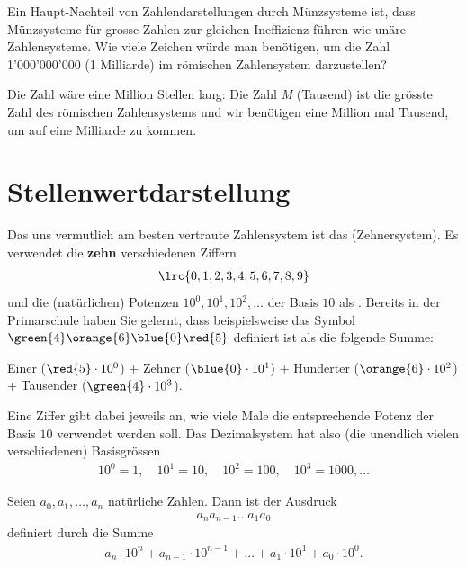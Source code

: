 \begin{myexercise}\label{myexercise:grosse-roem-zahlen}
	Ein Haupt-Nachteil von Zahlendarstellungen durch Münzsysteme ist, dass Münzsysteme für grosse Zahlen zur gleichen Ineffizienz führen wie unäre Zahlensysteme. Wie viele Zeichen würde man benötigen, um die Zahl 1'000'000'000 (1 Milliarde) im römischen Zahlensystem darzustellen?
	\begin{myanswer}
		Die Zahl wäre eine Million Stellen lang: Die Zahl \textit{M} (Tausend) ist die grösste Zahl des römischen Zahlensystems und wir benötigen eine Million mal Tausend, um auf eine Milliarde zu kommen.
	\end{myanswer}
\end{myexercise}
\section{Stellenwertdarstellung}
\label{section:stellenwertdarst}
Das uns vermutlich am besten vertraute Zahlensystem ist das 
(Zehnersystem). Es verwendet die \textbf{zehn} verschiedenen Ziffern
\begin{align*}
	\lrc{0,1,2,3,4,5,6,7,8,9}
\end{align*}
und die (natürlichen) Potenzen $10^0, 10^1, 10^2, \ldots$ der Basis $10$ als .
Bereits in der Primarschule haben Sie gelernt, dass beispielsweise das Symbol $\green{4}\orange{6}\blue{0}\red{5}$ definiert ist als die folgende
Summe:
\begin{center}
	 Einer ($\red{5}\cdot 10^0$) $+$  Zehner ($\blue{0}\cdot 10^1$) $+$  Hunderter
	($\orange{6}\cdot 10^2$) +  Tausender
	($\green{4}\cdot 10^3$).
\end{center}
Eine Ziffer gibt dabei jeweils an, wie viele Male die entsprechende Potenz der Basis $10$ verwendet werden soll. Das
Dezimalsystem hat also (die unendlich vielen verschiedenen) Basisgrössen
\begin{align*}
	10^0=1,\quad 10^1=10,\quad 10^2=100,\quad 10^3=1000,\ldots
\end{align*}

\begin{mydefinition}\label{mydefinition:Stellenwertdarstellung}
Seien $a_0, a_1, \ldots, a_n$ natürliche Zahlen. Dann ist der Ausdruck
\begin{align*}
	a_na_{n-1}\ldots a_1a_0
\end{align*}
definiert durch die Summe
\begin{align*}
	a_n\cdot 10^n + a_{n-1}\cdot 10^{n-1}+\ldots + a_1\cdot 10^1 + a_0\cdot 10^0.
\end{align*}
\end{mydefinition}

